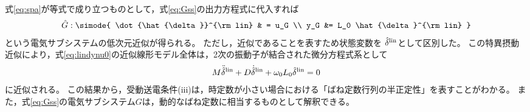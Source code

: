 \documentclass[tombow,dvipdfmx]{corona-a5-1.1}
\begin{document}
式\ref{eq:spa}が等式で成り立つものとして，式\ref{eq:Gss}の出力方程式に代入すれば
\begin{align}\label{eq:Gsssp}
\hat{G}: \simode{
\dot{\hat{\delta}}^{\rm lin} & = u_G \\
y_G &= L_0 \hat{\delta}^{\rm lin}
}
\end{align}
という電気サブシステムの低次元近似が得られる。
ただし，近似であることを表すため状態変数を
$\hat{\delta}^{\rm lin}$として区別した。
この特異摂動近似により，式\ref{eq:lindynu0}の近似線形モデル全体は，2次の振動子が結合された微分方程式系として
\begin{align}\label{eq:spamodel}
M \ddot{\hat{\delta}}^{\rm lin}
+ D \dot{\hat{\delta}}^{\rm lin}
+\omega_0 L_0 \hat{\delta}^{\rm lin}=0
\end{align}
に近似される。
この結果から，受動送電条件(iii)は，時定数が小さい場合における「ばね定数行列の半正定性」を表すことがわかる。
また，式\ref{eq:Gss}の電気サブシステム$G$は，動的なばね定数に相当するものとして解釈できる。
\end{document}
